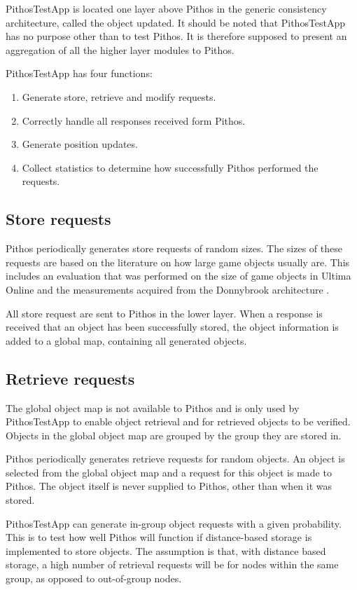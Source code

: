 PithosTestApp is located one layer above Pithos in the generic consistency architecture, called the object updated. It should be noted that PithosTestApp has no purpose other than to test Pithos. It is therefore supposed to present an aggregation of all the higher layer modules to Pithos.

PithosTestApp has four functions:
\begin{enumerate}
\item Generate store, retrieve and modify requests.
\item Correctly handle all responses received form Pithos.
\item Generate position updates.
\item Collect statistics to determine how successfully Pithos performed the requests.
\end{enumerate}

\subsection{Store requests}

Pithos periodically generates store requests of random sizes. The sizes of these requests are based on the literature on how large game objects usually are. This includes an evaluation that was performed on the size of game objects in Ultima Online and the measurements acquired from the Donnybrook architecture \cite{Bharambe_Donnybrook}.

All store request are sent to Pithos in the lower layer. When a response is received that an object has been successfully stored, the object information is added to a global map, containing all generated objects.

\subsection{Retrieve requests}

The global object map is not available to Pithos and is only used by PithosTestApp to enable object retrieval and for retrieved objects to be verified. Objects in the global object map are grouped by the group they are stored in.

Pithos periodically generates retrieve requests for random objects. An object is selected from the global object map and a request for this object is made to Pithos. The object itself is never supplied to Pithos, other than when it was stored.

PithosTestApp can generate in-group object requests with a given probability. This is to test how well Pithos will function if distance-based storage is implemented to store objects. The assumption is that, with distance based storage, a high number of retrieval requests will be for nodes within the same group, as opposed to out-of-group nodes.

